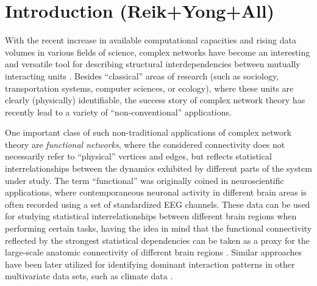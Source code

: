 \section{Introduction {\bf{(Reik+Yong+All)}}}

With the recent increase in available computational capacities and rising data volumes in various fields of science, complex networks have become an interesting and versatile tool for describing structural interdependencies between mutually interacting units \cite{Albert2002,Boccaletti2006,Costa2007,Newman2003}. Besides ``classical'' areas of research (such as sociology, transportation systems, computer sciences, or ecology), where these units are clearly (physically) identifiable, the success story of complex network theory has recently lead to a variety of ``non-conventional'' applications. 

One important class of such non-traditional applications of complex network theory are \emph{functional networks}, where the considered connectivity does not necessarily refer to ``physical'' vertices and edges, but reflects statistical interrelationships between the dynamics exhibited by different parts of the system under study. The term ``functional'' was originally coined in neuroscientific applications, where contemporaneous neuronal activity in different brain areas is often recorded using a set of standardized EEG channels. These data can be used for studying statistical interrelationships between different brain regions when performing certain tasks, having the idea in mind that the functional connectivity reflected by the strongest statistical dependencies can be taken as a proxy for the large-scale anatomic connectivity of different brain regions \cite{Zhou2006,Zhou2007}. Similar approaches have been later utilized for identifying dominant interaction patterns in other multivariate data sets, such as climate data \cite{Donges2009b,Donges2009a,Tsonis2004}.

